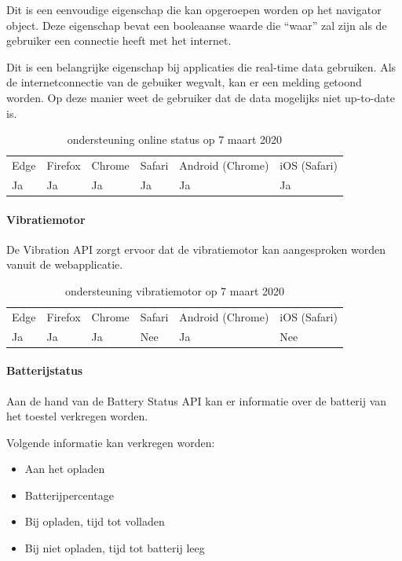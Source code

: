	Dit is een eenvoudige eigenschap die kan opgeroepen worden op het navigator object. Deze eigenschap bevat een booleaanse waarde die “waar” zal zijn als de gebruiker een connectie heeft met het internet. 
	
	Dit is een belangrijke eigenschap bij applicaties die real-time data gebruiken. Als de internetconnectie van de gebuiker wegvalt, kan er een melding  getoond worden. Op deze manier weet de gebruiker dat de data mogelijks niet up-to-date is.
	\begin{table}[H]
		\centering
		\begin{tabular}{llllll}
			Edge & Firefox & Chrome & Safari & Android (Chrome) & iOS (Safari) \\
			Ja   & Ja      &  Ja     & Ja     & Ja               & Ja          
		\end{tabular}	
		\caption{ondersteuning online status op 7 maart 2020}
	\end{table}
	
	\paragraph{Vibratiemotor }
	
	De Vibration API \autocite{Kostionen2018} zorgt ervoor dat de vibratiemotor kan aangesproken worden vanuit de webapplicatie.
	
	\begin{table}[H]
		\begin{tabular}{llllll}
			Edge & Firefox & Chrome & Safari & Android (Chrome) & iOS (Safari) \\
			Ja   & Ja      &  Ja     & Nee     & Ja               & Nee          
		\end{tabular}	
		\caption{ondersteuning vibratiemotor  op 7 maart 2020}
	\end{table}
	
	
	\paragraph{Batterijstatus}
	
	Aan de hand van de Battery Status API \autocite{Kostiainen2016} kan er informatie over de batterij van het toestel verkregen worden.
	
	Volgende informatie kan verkregen worden:
	 \begin{itemize}
		\item	Aan het opladen
		\item	Batterijpercentage
		\item	Bij opladen, tijd tot volladen
		\item	Bij niet opladen, tijd tot batterij leeg
	\end{itemize}
	
